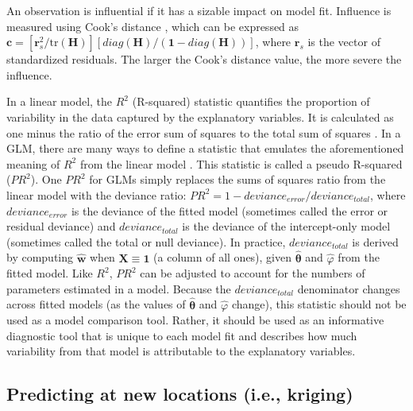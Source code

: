 \documentclass[
]{jss}
\begin{document}
An observation is influential if it has a sizable impact on model fit.
Influence is measured using Cook's distance
\citep{cook1979influential, cook1982residuals}, which can be expressed
as
\(\mathbf{c} = [\mathbf{r}^2_{s}/\text{tr}(\mathbf{H})][diag(\mathbf{H})/(\mathbf{1} - diag(\mathbf{H}))]\),
where \(\mathbf{r}_{s}\) is the vector of standardized residuals. The
larger the Cook's distance value, the more severe the influence.

In a linear model, the \(R^2\) (R-squared) statistic quantifies the
proportion of variability in the data captured by the explanatory
variables. It is calculated as one minus the ratio of the error sum of
squares to the total sum of squares \citep{rencher2008linear}. In a GLM,
there are many ways to define a statistic that emulates the
aforementioned meaning of \(R^2\) from the linear model
\citep{smith2013comparison}. This statistic is called a pseudo R-squared
(\(PR^2\)). One \(PR^2\) for GLMs simply replaces the sums of squares
ratio from the linear model with the deviance ratio:
\(PR^2 = 1 - deviance_{error}/deviance_{total}\), where
\(deviance_{error}\) is the deviance of the fitted model (sometimes
called the error or residual deviance) and \(deviance_{total}\) is the
deviance of the intercept-only model (sometimes called the total or null
deviance). In practice, \(deviance_{total}\) is derived by computing
\(\hat{\mathbf{w}}\) when \(\mathbf{X} \equiv \mathbf{1}\) (a column of
all ones), given \(\hat{\boldsymbol{\theta}}\) and \(\hat{\varphi}\)
from the fitted model. Like \(R^2\), \(PR^2\) can be adjusted to account
for the numbers of parameters estimated in a model. Because the
\(deviance_{total}\) denominator changes across fitted models (as the
values of \(\hat{\boldsymbol{\theta}}\) and \(\hat{\varphi}\) change),
this statistic should not be used as a model comparison tool. Rather, it
should be used as an informative diagnostic tool that is unique to each
model fit and describes how much variability from that model is
attributable to the explanatory variables.

\subsection{Predicting at new locations (i.e.,
kriging)}\label{predicting-at-new-locations}
\end{document}
